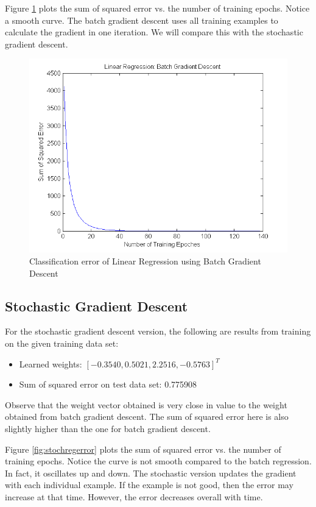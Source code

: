\documentclass[12pt]{article}
\begin{document}
Figure \ref{fig:batchregerror} plots the sum of squared error vs. the number of training epochs. Notice a smooth curve. The batch gradient descent uses all training examples to calculate the gradient in one iteration. We will compare this with the stochastic gradient descent.

\begin{figure}[!t]
  \centering
  \includegraphics[scale=.70]{img/batch_regression_errors.png}
  \caption{Classification error of Linear Regression using Batch Gradient Descent}
  \label{fig:batchregerror}
\end{figure}

\subsection{Stochastic Gradient Descent}
For the stochastic gradient descent version, the following are results from training on the given training data set:

\begin{itemize}
	\item Learned weights: \([-0.3540, 0.5021, 2.2516, -0.5763]^T\)
	\item Sum of squared error on test data set: 0.775908
\end{itemize}

Observe that the weight vector obtained is very close in value to the weight obtained from batch gradient descent. The sum of squared error here is also slightly higher than the one for batch gradient descent.

Figure \ref{fig:stochregerror} plots the sum of squared error vs. the number of training epochs. Notice the curve is not smooth compared to the batch regression. In fact, it oscillates up and down. The stochastic version updates the gradient with each individual example. If the example is not good, then the error may increase at that time. However, the error decreases overall with time.
\end{document}
